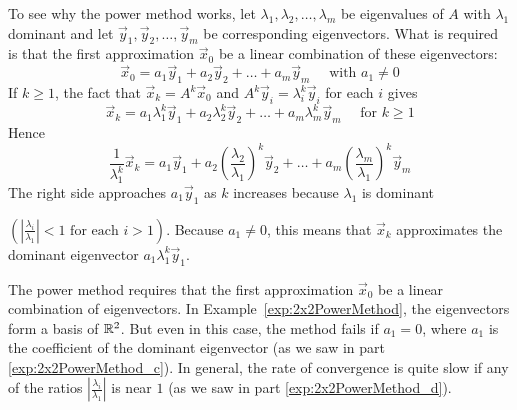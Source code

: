 \documentclass{ximera}
\begin{document}
To see why the power method works, let $\lambda_{1}, \lambda_{2}, \dots, \lambda_{m}$ be eigenvalues of $A$ with $\lambda_{1}$ dominant and let $\vec{y}_{1}, \vec{y}_{2}, \dots, \vec{y}_{m}$ be corresponding eigenvectors. What is required is that the first approximation $\vec{x}_{0}$ be a linear combination of these eigenvectors:
\begin{equation*}
\vec{x}_{0} = a_{1}\vec{y}_{1} + a_{2}\vec{y}_{2} + \dots + a_{m}\vec{y}_{m} \quad \mbox{ with } a_{1} \neq 0
\end{equation*}
If $k \geq 1$, the fact that $\vec{x}_{k} = A^{k}\vec{x}_{0}$ and $A^k\vec{y}_{i} = \lambda_{i}^k\vec{y}_{i}$ for each $i$ gives
\begin{equation*}
\vec{x}_{k} = a_{1}\lambda_{1}^k\vec{y}_{1} + a_{2}\lambda_{2}^k\vec{y}_{2} + \dots + a_{m}\lambda_{m}^k\vec{y}_{m} \quad \mbox{ for } k \geq 1
\end{equation*}
Hence
\begin{equation*}
\frac{1}{\lambda_{1}^k}\vec{x}_{k} = a_{1}\vec{y}_{1} + a_{2}\left(\frac{\lambda_{2}}{\lambda_{1}}\right)^k\vec{y}_{2} + \dots + a_{m}\left(\frac{\lambda_{m}}{\lambda_{1}}\right)^k\vec{y}_{m}
\end{equation*}
The right side approaches $a_{1}\vec{y}_{1}$ as $k$ increases because $\lambda_{1}$ is dominant 

$\left( \left|\frac{\lambda_{i}}{\lambda_{1}} \right| < 1 \mbox{ for each } i > 1 \right)$. Because $a_{1} \neq 0$, this means that $\vec{x}_{k}$ approximates the dominant eigenvector $a_{1}\lambda_{1}^k\vec{y}_{1}$.


The power method requires that the first approximation $\vec{x}_{0}$ be a linear combination of eigenvectors. In Example~\ref{exp:2x2PowerMethod}, the eigenvectors form a basis of $\mathbb{R}^2$. But even in this case, the method fails if $a_{1} = 0$, where $a_{1}$ is the coefficient of the dominant eigenvector (as we saw in part \ref{exp:2x2PowerMethod_c}). In general, the rate of convergence is quite slow if any of the ratios $\left| \frac{\lambda_{i}}{\lambda_{1}} \right|$ is near $1$ (as we saw in part \ref{exp:2x2PowerMethod_d}). 

\end{document}
